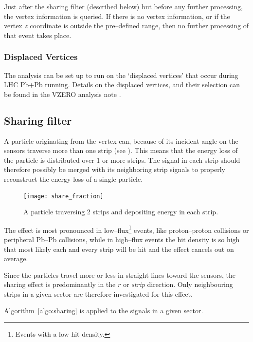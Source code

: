 \documentclass[11pt]{article}
\begin{document}
Just after the sharing filter (described below) but before any further
processing, the vertex information is queried.  If there is no vertex
information, or if the vertex $z$ coordinate is outside the
pre--defined range, then no further processing of that event takes
place.

\subsubsection{Displaced Vertices}
\label{sec:sub:sub:dispvtx}

The analysis can be set up to run on the `displaced vertices' that
occur during LHC Pb+Pb running. Details on the displaced vertices, and
their selection can be found in the VZERO analysis note \cite{maxime}.

\subsection{Sharing filter}
\label{sec:sub:sharing_filter}

A particle originating from the vertex can, because of its incident
angle on the \FMD{} sensors traverse more than one strip (see
).  This means that the energy loss of the
particle is distributed over 1 or more strips.  The signal in each
strip should therefore possibly be merged with its neighboring strip
signals to properly reconstruct the energy loss of a single particle.

\begin{figure}[htbp]
  \centering
  \texttt{[image: share\_fraction]}
  \caption{A particle traversing 2 strips and depositing energy in
    each strip. }
  \label{fig:share_fraction}
\end{figure}

The effect is most pronounced in low--flux\footnote{Events with a low
  hit density.} events, like proton--proton collisions or peripheral
Pb--Pb collisions, while in high--flux events the hit density is so
high that most likely each and every strip will be hit and the effect
cancels out on average.

Since the particles travel more or less in straight lines toward the
\FMD{} sensors, the sharing effect is predominantly in the $r$ or
\emph{strip} direction.  Only neighbouring strips in a given sector are
therefore investigated for this effect.  

Algorithm~\ref{algo:sharing} is applied to the signals in a given
sector.
\end{document}
